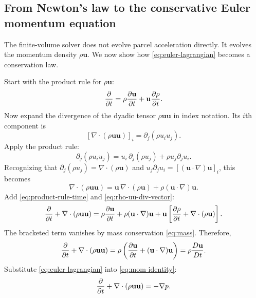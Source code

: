 \documentclass[11pt]{article}
\newcommand{\uvec}{\mathbf{u}}
\begin{document}
\subsection{From Newton's law to the conservative Euler momentum equation}
The finite-volume solver does not evolve parcel acceleration directly. It evolves the momentum density $\rho\uvec$. We now show how \eqref{eq:euler-lagrangian} becomes a conservation law.

Start with the product rule for $\rho\uvec$:
\begin{equation}
\pdv{}{t}(\rho\uvec)=\rho\pdv{\uvec}{t}+\uvec\pdv{\rho}{t}.
\label{eq:product-rule-time}
\end{equation}
Now expand the divergence of the dyadic tensor $\rho\uvec\uvec$ in index notation. Its $i$th component is
\begin{equation}
\left[\nabla\cdot(\rho\uvec\uvec)\right]_i = \partial_j(\rho u_i u_j).
\label{eq:rho-uu-div-index-start}
\end{equation}
Apply the product rule:
\begin{equation}
\partial_j(\rho u_i u_j)=u_i\,\partial_j(\rho u_j)+\rho u_j\partial_j u_i.
\label{eq:rho-uu-div-index-expanded}
\end{equation}
Recognizing that $\partial_j(\rho u_j)=\nabla\cdot(\rho\uvec)$ and $u_j\partial_j u_i=[(\uvec\cdot\nabla)\uvec]_i$, this becomes
\begin{equation}
\nabla\cdot(\rho\uvec\uvec)=\uvec\,\nabla\cdot(\rho\uvec)+\rho(\uvec\cdot\nabla)\uvec.
\label{eq:rho-uu-div-vector}
\end{equation}
Add \eqref{eq:product-rule-time} and \eqref{eq:rho-uu-div-vector}:
\begin{equation}
\pdv{}{t}(\rho\uvec)+\nabla\cdot(\rho\uvec\uvec)
=\rho\pdv{\uvec}{t}+\rho(\uvec\cdot\nabla)\uvec+\uvec\left[\pdv{\rho}{t}+\nabla\cdot(\rho\uvec)\right].
\label{eq:momentum-preidentity}
\end{equation}
The bracketed term vanishes by mass conservation \eqref{eq:mass}. Therefore,
\begin{equation}
\pdv{}{t}(\rho\uvec)+\nabla\cdot(\rho\uvec\uvec)=\rho\left(\pdv{\uvec}{t}+(\uvec\cdot\nabla)\uvec\right)=\rho\frac{D\uvec}{Dt}.
\label{eq:mom-identity}
\end{equation}
Substitute \eqref{eq:euler-lagrangian} into \eqref{eq:mom-identity}:
\begin{equation}
\pdv{}{t}(\rho\uvec)+\nabla\cdot(\rho\uvec\uvec) = -\nabla p.
\label{eq:euler-precons}
\end{equation}
\end{document}
